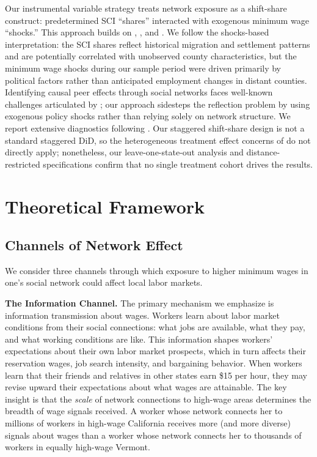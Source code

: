 \documentclass[12pt]{article}
\begin{document}
Our instrumental variable strategy treats network exposure as a shift-share construct: predetermined SCI ``shares'' interacted with exogenous minimum wage ``shocks.'' This approach builds on \citet{bartik1991benefits}, \citet{goldsmithpinkham2020bartik}, and \citet{borusyak2022quasi}. We follow the shocks-based interpretation: the SCI shares reflect historical migration and settlement patterns and are potentially correlated with unobserved county characteristics, but the minimum wage shocks during our sample period were driven primarily by political factors rather than anticipated employment changes in distant counties. Identifying causal peer effects through social networks faces well-known challenges articulated by \citet{manski1993identification}; our approach sidesteps the reflection problem by using exogenous policy shocks rather than relying solely on network structure. We report extensive diagnostics following \citet{adao2019shift}. Our staggered shift-share design is not a standard staggered DiD, so the heterogeneous treatment effect concerns of \citet{dechaisemartin2020, dechaisemartin2024} do not directly apply; nonetheless, our leave-one-state-out analysis and distance-restricted specifications confirm that no single treatment cohort drives the results.


\section{Theoretical Framework}
\label{sec:theory}

\subsection{Channels of Network Effect}

We consider three channels through which exposure to higher minimum wages in one's social network could affect local labor markets.

\textbf{The Information Channel.} The primary mechanism we emphasize is information transmission about wages. Workers learn about labor market conditions from their social connections: what jobs are available, what they pay, and what working conditions are like. This information shapes workers' expectations about their own labor market prospects, which in turn affects their reservation wages, job search intensity, and bargaining behavior. When workers learn that their friends and relatives in other states earn \$15 per hour, they may revise upward their expectations about what wages are attainable. The key insight is that the \textit{scale} of network connections to high-wage areas determines the breadth of wage signals received. A worker whose network connects her to millions of workers in high-wage California receives more (and more diverse) signals about wages than a worker whose network connects her to thousands of workers in equally high-wage Vermont.
\end{document}
